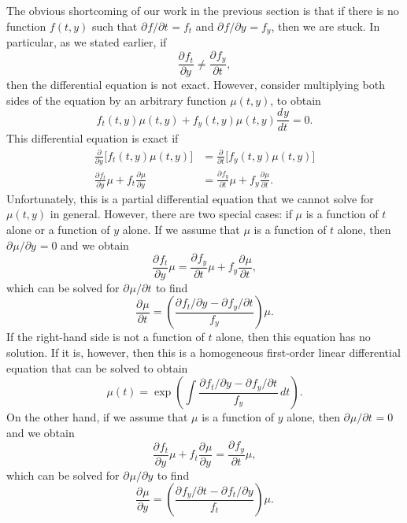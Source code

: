 \documentclass{myart}
\newcommand{\deriv}[3][]{\frac{d^{#1}#2}{d#3^{#1}}}
\newcommand{\pderiv}[3][]{\frac{\partial^{#1}#2}{\partial#3^{#1}}}
\newcommand{\fpderiv}[3][]{\partial^{#1}#2/\partial#3^{#1}}
\begin{document}
The obvious shortcoming of our work in the previous section is that if
there is no function $f(t, y)$ such that $\fpderiv{f}{t} = f_t$ and
$\fpderiv{f}{y} = f_y$, then we are stuck. In particular, as we stated
earlier, if
\begin{equation*}
  \pderiv{f_t}{y} \neq \pderiv{f_y}{t},
\end{equation*}
then the differential equation is not exact. However, consider
multiplying both sides of the equation by an arbitrary function
$\mu(t, y)$, to obtain
\begin{equation*}
  f_t(t, y) \mu(t, y) + f_y(t, y) \mu(t, y) \deriv{y}{t} = 0.
\end{equation*}
This differential equation is exact if
\begin{align*}
     \pderiv{}{y} \Big[f_t(t, y) \mu(t, y)\Big]
  &= \pderiv{}{t} \Big[f_y(t, y) \mu(t, y)\Big] \\
     \pderiv{f_t}{y} \mu + f_t \pderiv{\mu}{y}
  &= \pderiv{f_y}{t} \mu + f_y \pderiv{\mu}{t}.
\end{align*}
Unfortunately, this is a partial differential equation that we cannot
solve for $\mu(t, y)$ in general. However, there are two special
cases: if $\mu$ is a function of $t$ alone or a function of $y$ alone.
If we assume that $\mu$ is a function of $t$ alone, then
$\fpderiv{\mu}{y} = 0$ and we obtain
\begin{equation*}
  \pderiv{f_t}{y} \mu = \pderiv{f_y}{t} \mu + f_y \pderiv{\mu}{t},
\end{equation*}
which can be solved for $\fpderiv{\mu}{t}$ to find
\begin{equation*}
  \pderiv{\mu}{t} = \left(\frac{\fpderiv{f_t}{y}
                  - \fpderiv{f_y}{t}}{f_y}\right) \mu.
\end{equation*}
If the right-hand side is not a function of $t$ alone, then this
equation has no solution. If it is, however, then this is a
homogeneous first-order linear differential equation that can be
solved to obtain
\begin{equation*}
  \mu(t) = \exp\left(\int \frac{\fpderiv{f_t}{y}
         - \fpderiv{f_y}{t}}{f_y} \,dt\right).
\end{equation*}
On the other hand, if we assume that $\mu$ is a function of $y$ alone,
then $\fpderiv{\mu}{t} = 0$ and we obtain
\begin{equation*}
  \pderiv{f_t}{y} \mu + f_t \pderiv{\mu}{y} = \pderiv{f_y}{t} \mu,
\end{equation*}
which can be solved for $\fpderiv{\mu}{y}$ to find
\begin{equation*}
  \pderiv{\mu}{y} = \left(\frac{\fpderiv{f_y}{t}
                  - \fpderiv{f_t}{y}}{f_t}\right) \mu.
\end{equation*}
\end{document}
